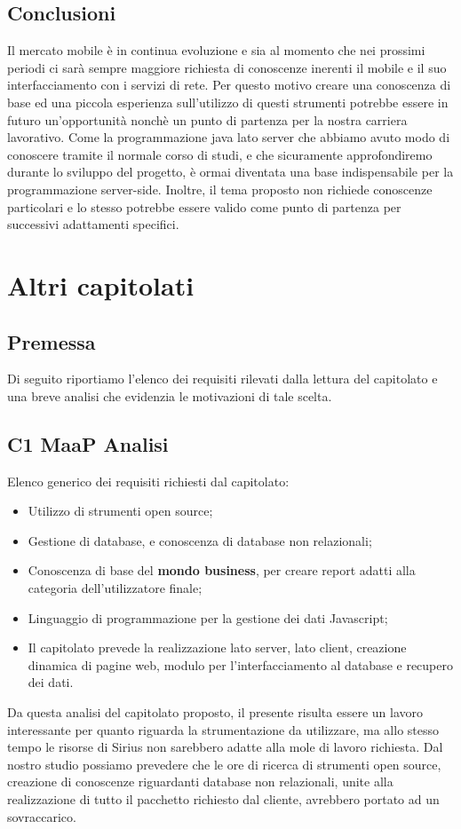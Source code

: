 \subsection{Conclusioni}
Il mercato mobile è in continua evoluzione e sia al momento che nei prossimi periodi ci sarà sempre maggiore richiesta di conoscenze inerenti il mobile e il suo interfacciamento con i servizi di rete. Per questo motivo creare una conoscenza di base ed una piccola esperienza sull'utilizzo di questi strumenti potrebbe essere in futuro un'opportunità nonchè un punto di partenza per la nostra carriera lavorativo. Come la programmazione java lato server che abbiamo avuto modo di conoscere tramite il normale corso di studi, e che sicuramente approfondiremo durante lo sviluppo del progetto, è ormai diventata una base indispensabile per la programmazione server-side. Inoltre, il tema proposto non richiede conoscenze particolari e lo stesso potrebbe essere valido come punto di partenza per successivi adattamenti specifici. \\

\section{Altri capitolati}
\subsection{Premessa}
Di seguito riportiamo l'elenco dei requisiti rilevati dalla lettura del capitolato e una breve analisi che evidenzia le motivazioni di tale scelta.\\
\subsection{C1 MaaP Analisi}
Elenco generico dei requisiti richiesti dal capitolato:
\begin{itemize} 
\item Utilizzo di strumenti open source;
\item Gestione di database, e conoscenza di database non relazionali;
\item Conoscenza di base del \textbf{mondo business}, per creare report adatti alla categoria dell'utilizzatore finale;
\item Linguaggio di programmazione per la gestione dei dati Javascript;
\item Il capitolato prevede la realizzazione lato server, lato client, creazione dinamica di pagine web, modulo per l'interfacciamento al database e recupero dei dati.
\end{itemize}
Da questa analisi del capitolato proposto, il presente risulta essere un lavoro interessante per quanto riguarda la strumentazione da utilizzare, ma allo stesso tempo le risorse di Sirius non sarebbero adatte alla mole di lavoro richiesta. Dal nostro studio possiamo prevedere che le ore di ricerca di strumenti open source, creazione di conoscenze riguardanti database non relazionali, unite alla realizzazione di tutto il pacchetto richiesto dal cliente, avrebbero portato ad un sovraccarico.
\\
